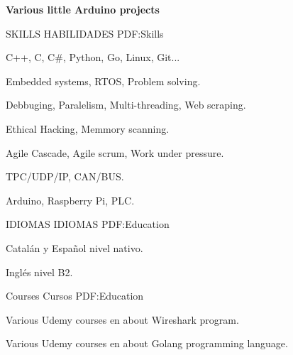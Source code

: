 \documentclass[letterpaper,MMMyyyy,nonstopmode]{simpleresumecv}
\begin{document}
\begin{Body}
\Gap

{\textbf{Various little Arduino projects}}


\hfill


\Gap
\Gap


\Section
{SKILLS}
{HABILIDADES}
{PDF:Skills}

\Entry

C++, C, C\#, Python, Go, Linux, Git...

\Gap

Embedded systems, RTOS, Problem solving.

\Gap

Debbuging, Paralelism, Multi-threading, Web scraping.

\Gap

Ethical Hacking, Memmory scanning.

\Gap

Agile Cascade, Agile scrum, Work under pressure.

\Gap

TPC/UDP/IP, CAN/BUS.

\Gap

Arduino, Raspberry Pi, PLC.

\Gap


\Gap
\Gap
\hfill



\Section
{IDIOMAS}
{IDIOMAS}
{PDF:Education}
\Entry

Catalán y Español nivel nativo.

\Gap

Inglés nivel B2.

\hfill

\Gap



\Section
{Courses}
{Cursos}
{PDF:Education}
\Entry

Various Udemy courses en about Wireshark program.

\Gap

Various Udemy courses en about Golang programming language.


\end{Body}
\end{document}
